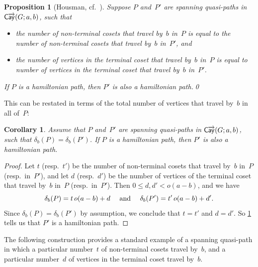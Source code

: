 \documentclass[11pt]{amsart}
\makeatletter
\newtheorem{prop}[equation]{Proposition}
\newtheorem{cor}[equation]{Corollary}
\theoremstyle{definition}
\numberwithin{case}{startcases}
\newcommand{\noprelistbreak}{\@nobreaktrue\nopagebreak\vskip4pt} %
\numberwithin{equation}{section}
\newcommand{\cayd}{\mathop{\mathsf{C}\mkern-1mu\overrightarrow{\mathsf{ay}}}}
\makeatother
\begin{document}
	\begin{prop}[Housman, cf.~{\cite[Prop.~6.7]{Curran}}] \label{SameNumCosetsAndD}
		Suppose $P$ and~$P'$ are spanning quasi-paths in $\cayd(G; a,b)$, such that 
		\noprelistbreak
		\begin{itemize}
			\item the number of non-terminal cosets that travel by~$b$ in~$P$ is equal to the number of non-terminal cosets that travel by~$b$ in~$P'$,
			and
			\item the number of vertices in the terminal coset that travel by~$b$ in~$P$ is equal to number of vertices in the terminal coset that travel by~$b$ in~$P'$.
		\end{itemize}
		If $P$ is a hamiltonian path, then $P'$ is also a hamiltonian path.\qed
	\end{prop}
	
	This can be restated in terms of the total number of vertices that travel by~$b$ in all of~$P$:
	
	\begin{cor} \label{samedelta}
		Assume that $P$ and~$P'$ are spanning quasi-paths in $\cayd(G; a,b)$, such that $\delta_b(P) = \delta_b(P')$.
		If $P$ is a hamiltonian path, then $P'$ is also a hamiltonian path.
	\end{cor}
	
	\begin{proof}
		Let $t$ (resp.~$t'$) be the number of non-terminal cosets that travel by~$b$ in~$P$ (resp.~in~$P'$), and let $d$ (resp.~$d'$) be the number of vertices of the terminal coset that travel by~$b$ in~$P$ (resp.~in~$P'$). Then $0 \le d,d' < o(a - b)$, and we have
		\[ \text{$\delta_b(P) = t \, o(a - b) + d$ 
			\quad and \quad 
			$\delta_b(P') = t' \, o(a - b) + d'$} .\]
		Since $\delta_b(P) = \delta_b(P')$ by assumption, we conclude that $t = t'$ and $d = d'$. So \cref{SameNumCosetsAndD} tells us that $P'$ is a hamiltonian path.
	\end{proof}
	
	The following construction provides a standard example of a spanning quasi-path in which a particular number~$t$ of non-terminal cosets travel by~$b$, and a particular number~$d$ of vertices in the terminal coset travel by~$b$.
	
\end{document}
